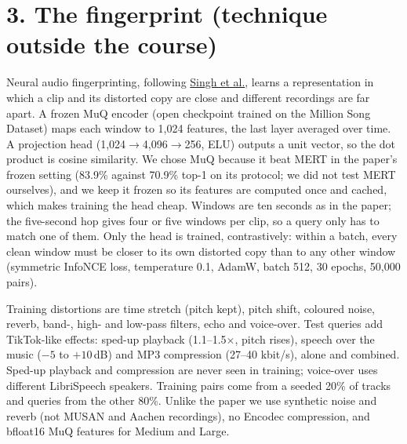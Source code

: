 \documentclass[11pt,a4paper]{article}
\begin{document}
\section*{3. The fingerprint (technique outside the course)}
Neural audio fingerprinting, following \href{https://arxiv.org/abs/2511.05399}{Singh et al.}, learns a representation in which a clip and its distorted copy are close and different recordings are far apart. A frozen MuQ encoder (open checkpoint trained on the Million Song Dataset) maps each window to 1,024 features, the last layer averaged over time. A projection head (1,024$\to$4,096$\to$256, ELU) outputs a unit vector, so the dot product is cosine similarity. We chose MuQ because it beat MERT in the paper's frozen setting (83.9\% against 70.9\% top-1 on its protocol; we did not test MERT ourselves), and we keep it frozen so its features are computed once and cached, which makes training the head cheap. Windows are ten seconds as in the paper; the five-second hop gives four or five windows per clip, so a query only has to match one of them. Only the head is trained, contrastively: within a batch, every clean window must be closer to its own distorted copy than to any other window (symmetric InfoNCE loss, temperature 0.1, AdamW, batch 512, 30 epochs, 50,000 pairs).

Training distortions are time stretch (pitch kept), pitch shift, coloured noise, reverb, band-, high- and low-pass filters, echo and voice-over. Test queries add TikTok-like effects: sped-up playback (1.1--1.5$\times$, pitch rises), speech over the music ($-5$ to $+10$\,dB) and MP3 compression (27--40 kbit/s), alone and combined. Sped-up playback and compression are never seen in training; voice-over uses different LibriSpeech speakers. Training pairs come from a seeded 20\% of tracks and queries from the other 80\%. Unlike the paper we use synthetic noise and reverb (not MUSAN and Aachen recordings), no Encodec compression, and bfloat16 MuQ features for Medium and Large.
\end{document}
